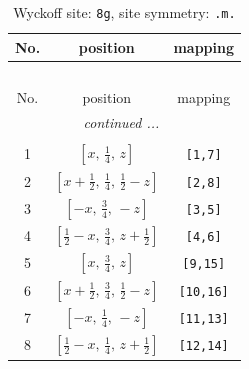 \documentclass[fleqn,8pt]{jsarticle}
\begin{document}
\begin{longtable}{ccc}
\caption{Wyckoff site: {\tt 8g}, site symmetry: {\tt .m.}}
 \\
 \hline \hline
No. & position & mapping \\ \hline \endfirsthead

\multicolumn{2}{l}{\tablename\ \thetable{}} \\
 \hline \hline
No. & position & mapping \\ \hline \endhead

 \hline \hline
\multicolumn{2}{r}{\footnotesize\it continued ...} \\ \endfoot

 \hline \hline
\multicolumn{2}{r}{} \\ \endlastfoot

1 & $\left[ x,\, \frac{1}{4},\, z \right]$ & {\tt [1,7]} \\ \hline
2 & $\left[ x + \frac{1}{2},\, \frac{1}{4},\, \frac{1}{2} - z \right]$ & {\tt [2,8]} \\ \hline
3 & $\left[ - x,\, \frac{3}{4},\, - z \right]$ & {\tt [3,5]} \\ \hline
4 & $\left[ \frac{1}{2} - x,\, \frac{3}{4},\, z + \frac{1}{2} \right]$ & {\tt [4,6]} \\ \hline
5 & $\left[ x,\, \frac{3}{4},\, z \right]$ & {\tt [9,15]} \\ \hline
6 & $\left[ x + \frac{1}{2},\, \frac{3}{4},\, \frac{1}{2} - z \right]$ & {\tt [10,16]} \\ \hline
7 & $\left[ - x,\, \frac{1}{4},\, - z \right]$ & {\tt [11,13]} \\ \hline
8 & $\left[ \frac{1}{2} - x,\, \frac{1}{4},\, z + \frac{1}{2} \right]$ & {\tt [12,14]} \\
\end{longtable}
\renewcommand{\arraystretch}{1.2}
\end{document}
